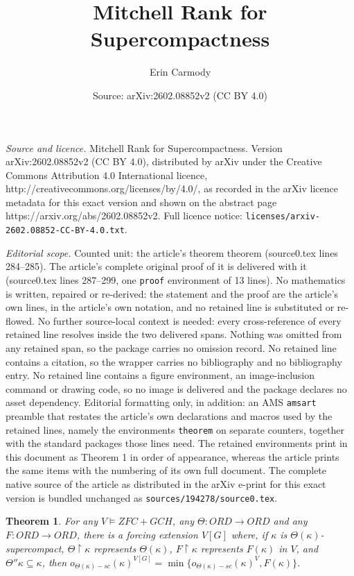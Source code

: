 \documentclass[10pt,a4paper]{amsart}
\title{Mitchell Rank for Supercompactness}
\author{Erin Carmody}
\date{Source: arXiv:2602.08852v2 (CC BY 4.0)}
\newtheorem{theorem}{Theorem}
\begin{document}
\maketitle

\noindent\emph{Source and licence.} Mitchell Rank for Supercompactness. Version arXiv:2602.08852v2 (CC BY 4.0), distributed by arXiv under the Creative Commons Attribution 4.0 International licence, http://creativecommons.org/licenses/by/4.0/, as recorded in the arXiv licence metadata for this exact version and shown on the abstract page https://arxiv.org/abs/2602.08852v2. Full licence notice: \texttt{licenses/arxiv-2602.08852-CC-BY-4.0.txt}.\par\smallskip

\noindent\textit{Editorial scope.} Counted unit: the article's theorem theorem (source0.tex lines 284--285). The article's complete original proof of it is delivered with it (source0.tex lines 287--299, one \texttt{proof} environment of 13 lines). No mathematics is written, repaired or re-derived: the statement and the proof are the article's own lines, in the article's own notation, and no retained line is substituted or re-flowed.  No further source-local context is needed: every cross-reference of every retained line resolves inside the two delivered spans.  Nothing was omitted from any retained span, so the package carries no omission record.  No retained line contains a citation, so the wrapper carries no bibliography and no bibliography entry.  No retained line contains a figure environment, an image-inclusion command or drawing code, so no image is delivered and the package declares no asset dependency.  Editorial formatting only, in addition: an AMS \texttt{amsart} preamble that restates the article's own declarations and macros used by the retained lines, namely the environments \texttt{theorem} on separate counters, together with the standard packages those lines need.  The retained environments print in this document as Theorem 1 in order of appearance, whereas the article prints the same items with the numbering of its own full document.  The complete native source of the article as distributed in the arXiv e-print for this exact version is bundled unchanged as \texttt{sources/194278/source0.tex}.
\begin{theorem} For any $V \models ZFC + GCH$, any $\Theta: ORD \to ORD$ and any $F: ORD \to ORD$, there is a forcing extension $V[G]$ where, if $\kappa$ is $\Theta(\kappa)$-supercompact, $\Theta \upharpoonright \kappa$ represents $\Theta(\kappa)$, $F \upharpoonright \kappa$ represents $F(\kappa)$ in $V$, and $\Theta''\kappa \subseteq \kappa$, then $o_{\Theta(\kappa)-sc}(\kappa)^{V[G]} = \min\{o_{\Theta(\kappa)-sc}(\kappa)^V, F(\kappa)\}$.
\end{theorem}
\end{document}
